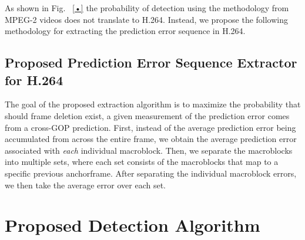 
As shown in Fig. ~\ref{•} the probability of detection using the methodology from MPEG-2 videos does not translate to H.264. Instead, we propose the following methodology for extracting the prediction error sequence in H.264.

\subsection{Proposed Prediction Error Sequence Extractor for H.264}

The goal of the proposed extraction algorithm is to maximize the probability that should frame deletion exist, a given measurement of the prediction error comes from a cross-GOP prediction. First, instead of the average prediction error being accumulated from across the entire frame, we obtain the average prediction error associated with \emph{each} individual macroblock. Then, we separate the macroblocks into multiple sets, where each set consists of the macroblocks that map to a specific previous anchorframe. After separating the individual macroblock errors, we then take the average error over each set. 

\section{Proposed Detection Algorithm}